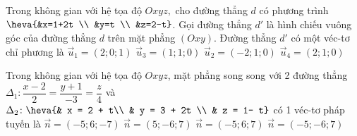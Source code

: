 	\begin{ex}%
	Trong không gian với hệ tọa độ $Oxyz,$ cho đường thẳng $d$ có phương trình $\heva{&x=1+2t \\ &y=t \\ &z=2-t}$. Gọi đường thẳng $d'$ là hình chiếu vuông góc của đường thẳng $d$ trên mặt phẳng $(Oxy)$. Đường thẳng $d'$ có một véc-tơ chỉ phương là
	\choice
	{$\overrightarrow{u}_1=(2;0;1)$}
	{$\overrightarrow{u}_3=(1;1;0)$}
	{$\overrightarrow{u}_2=(-2;1;0)$}
	{\True $\overrightarrow{u}_4=(2;1;0)$}
	\end{ex}
	\begin{ex}%
	Trong không gian với hệ tọa độ $Oxyz$, mặt phẳng song song với 2 đường thẳng $\Delta_1 \colon \dfrac{x - 2}{2} = \dfrac{y + 1}{-3} = \dfrac{z}{4}$ và $\Delta_2 \colon \heva{& x = 2 + t\\ & y = 3 + 2t \\ & z = 1- t}$ có 1 véc-tơ pháp tuyến là 
	\choice
	{$\vec{n} = (-5; 6; -7)$}
	{$\vec{n} = (5; - 6 ; 7)$}
	{\True $\vec{n} = (-5; 6; 7)$}
	{$\vec{n} = (-5; -6; 7)$}
	\end{ex}
